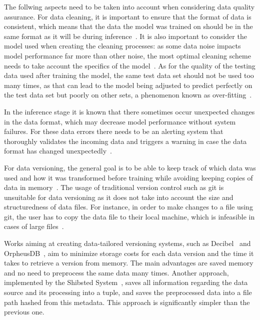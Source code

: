 The follwing aspects need to be taken into account when considering data quality assurance. For data cleaning, it is important to ensure that the format of data is consistent, which means that the data the model was trained on should be in the same format as it will be during inference~\cite{polyzotisDataLifecycleChallenges2018}. It is also important to consider the model used when creating the cleaning processes: as some data noise impacts model performance far more than other noise, the most optimal cleaning scheme needs to take account the specifics of the model~\cite{renggliDataQualityDrivenView2021}. As for the quality of the testing data used after training the model, the same test data set should not be used too many times, as that can lead to the model being adjusted to predict perfectly on the test data set but poorly on other sets, a phenomenon known as over-fitting~\cite{renggliDataQualityDrivenView2021}.

In the inference stage it is known that there sometimes occur unexpected changes in the data format, which may decrease model performance without system failures. For these data errors there needs to be an alerting system that thoroughly validates the incoming data and triggers a warning in case the data format has changed unexpectedly~\cite{polyzotisDataLifecycleChallenges2018}.

For data versioning, the general goal is to be able to keep track of which data was used and how it was transformed before training while avoiding keeping copies of data in memory~\cite{maddoxDecibelRelationalDataset2016}. The usage of traditional version control such as git is unsuitable for data versioning as it does not take into account the size and structuredness of data files. For instance, in order to make changes to a file using git, the user has to copy the data file to their local machine, which is infeasible in cases of large files~\cite{maddoxDecibelRelationalDataset2016}.

Works aiming at creating data-tailored versioning systems, such as Decibel~\cite{maddoxDecibelRelationalDataset2016} and OrpheusDB~\cite{huangEffectiveDataVersioning2019}, aim to minimize storage costs for each data version and the time it takes to retrieve a version from memory. The main advantages are saved memory and no need to preprocess the same data many times. Another approach, implemented by the Shibsted System~\cite{vanderweideVersioningEndtoEndMachine2017}, saves all information regarding the data source and its processing into a tuple, and saves the preprocessed data into a file path hashed from this metadata. This approach is significantly simpler than the previous one.

